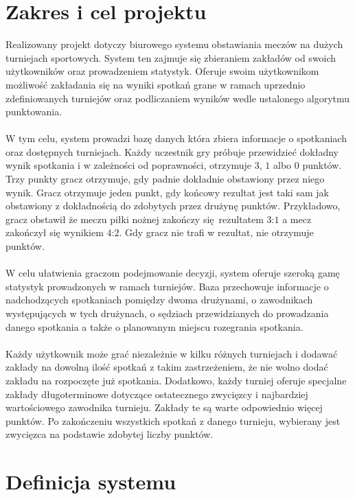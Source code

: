 \documentclass{mwrep}[15pt]
\begin{document}
\chapter{Zakres i cel projektu}
Realizowany projekt dotyczy biurowego systemu obstawiania meczów
na dużych turniejach sportowych. System ten zajmuje się zbieraniem 
zakładów od swoich użytkowników oraz prowadzeniem statystyk. 
Oferuje swoim użytkownikom możliwość zakładania się na wyniki spotkań
grane w ramach uprzednio zdefiniowanych turniejów oraz podliczaniem 
wyników wedle ustalonego algorytmu punktowania.
\\ 
\\
\indent W tym celu, system prowadzi bazę danych która zbiera informacje o spotkaniach
oraz dostępnych turniejach. Każdy uczestnik gry próbuje przewidzieć dokładny wynik 
spotkania i w zależności od poprawności, otrzymuje $3$, $1$ albo $0$ punktów.
Trzy punkty gracz otrzymuje, gdy padnie dokładnie obstawiony przez niego wynik.
Gracz otrzymuje jeden punkt, gdy końcowy rezultat jest taki sam jak obstawiony z dokładnością
do zdobytych przez drużynę punktów. Przykładowo, gracz obstawił że meczu piłki
nożnej zakończy się rezultatem $3$:$1$ a mecz zakończył się wynikiem $4$:$2$. 
Gdy gracz nie trafi w rezultat, nie otrzymuje punktów.  
\\
\\
\indent W celu ułatwienia graczom podejmowanie decyzji, system oferuje szeroką gamę statystyk 
prowadzonych w ramach turniejów. Baza przechowuje informacje o nadchodzących spotkaniach 
pomiędzy dwoma drużynami, o zawodnikach występujących w tych drużynach, o sędziach 
przewidzianych do prowadzania danego spotkania a także o planowanym miejscu rozegrania spotkania.  
\\
\\
\indent Każdy użytkownik może grać niezależnie w kilku różnych turniejach i dodawać zakłady 
na dowolną ilość spotkań z takim zastrzeżeniem, że nie wolno dodać zakładu na 
rozpoczęte już spotkania. Dodatkowo, każdy turniej oferuje specjalne zakłady długoterminowe
dotyczące ostatecznego zwycięzcy i najbardziej wartościowego zawodnika turnieju. Zakłady 
te są warte odpowiednio więcej punktów. Po zakończeniu wszystkich spotkań z danego turnieju, wybierany 
jest zwycięzca na podstawie zdobytej liczby punktów. 


\chapter{Definicja systemu}
\end{document}
